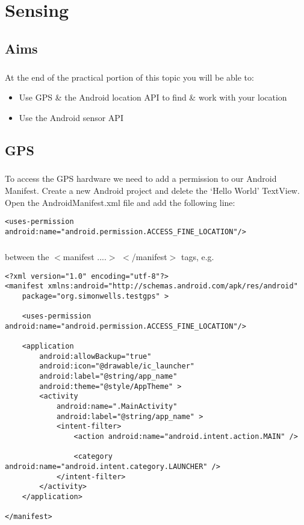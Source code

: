 \chapter{Sensing}
\section{Aims}
\paragraph{} At the end of the practical portion of this topic you will be able to:

\begin{itemize}
\item Use GPS \& the Android location API to find \& work with your location
\item Use the Android sensor API
\end{itemize}

\section{GPS}
\paragraph{} To access the GPS hardware we need to add a permission to our Android Manifest. Create a new Android project and delete the `Hello World' TextView. Open the AndroidManifest.xml file and add the following line:

\begin{lstlisting}
<uses-permission android:name="android.permission.ACCESS_FINE_LOCATION"/>
\end{lstlisting}

\paragraph{} between the $<$manifest ....$>$ $<$/manifest$>$ tags, e.g.

\begin{lstlisting}
<?xml version="1.0" encoding="utf-8"?>
<manifest xmlns:android="http://schemas.android.com/apk/res/android"
    package="org.simonwells.testgps" >

    <uses-permission android:name="android.permission.ACCESS_FINE_LOCATION"/>

    <application
        android:allowBackup="true"
        android:icon="@drawable/ic_launcher"
        android:label="@string/app_name"
        android:theme="@style/AppTheme" >
        <activity
            android:name=".MainActivity"
            android:label="@string/app_name" >
            <intent-filter>
                <action android:name="android.intent.action.MAIN" />

                <category android:name="android.intent.category.LAUNCHER" />
            </intent-filter>
        </activity>
    </application>

</manifest>
\end{lstlisting}

